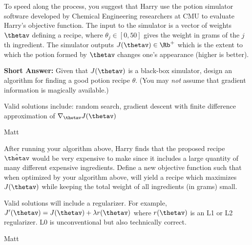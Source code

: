 \begin{questions}
\begin{EnvFullwidth}
    To speed along the process, you suggest that Harry use the potion simulator software developed by Chemical Engineering researchers at CMU to evaluate Harry's objective function. The input to the simulator is a vector of weights $\thetav$ defining a recipe, where $\theta_j \in [0, 50]$ gives the weight in grams of the $j$th ingredient. The simulator outputs $J(\thetav) \in \Rb^+$ which is the extent to which the potion formed by $\thetav$ changes one's appearance (higher is better).
    
\end{EnvFullwidth}
    
\question[2] \textbf{Short Answer:} Given that $J(\thetav)$ is a black-box simulator, design an algorithm for finding a good potion recipe $\theta$. (You may \emph{not} assume that gradient information is magically available.)
    \begin{tcolorbox}[fit,height=1cm, width=15cm, blank, borderline={1pt}{-2pt}]
    \end{tcolorbox}
    \begin{soln}
    Valid solutions include: random search, gradient descent with finite difference approximation of $\nabla_{\thetav}J(\thetav)$
    \end{soln}
    \begin{qauthor}
    Matt
    \end{qauthor}
    
\question[2] After running your algorithm above, Harry finds that the proposed recipe $\hat{\thetav}$ would be very expensive to make since it includes a large quantity of many different expensive ingredients. Define a new objective function such that when optimized by your algorithm above, will yield a recipe which maximizes $J(\thetav)$ while keeping the total weight of all ingredients (in grams)  small.
    \begin{tcolorbox}[fit,height=1cm, width=15cm, blank, borderline={1pt}{-2pt}]
    \end{tcolorbox}
    \begin{soln}
    Valid solutions will include a regularizer. For example,  $J'(\thetav) = J(\thetav) + \lambda r(\thetav)$ where $r(\thetav)$ is an L1 or L2 regularizer. L0 is unconventional but also technically correct.
    \end{soln}
    \begin{qauthor}
    Matt
    \end{qauthor}
    

\end{questions}
